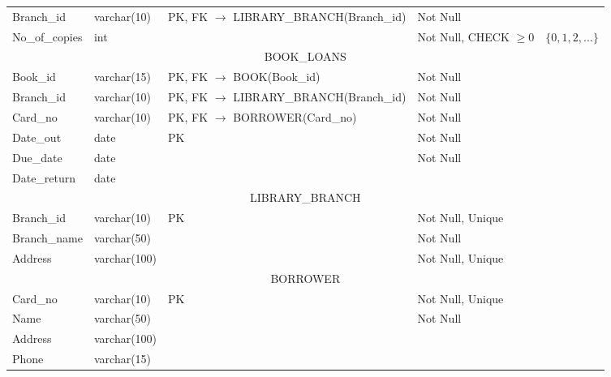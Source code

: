 \documentclass[12pt,a4paper]{article}
\begin{document}
\begin{enumerate}
\begin{enumerate}
\begin{table}[H]
{\begin{tabular}{|p{3cm}|p{2.5cm}|p{3.5cm}|p{4cm}|p{2cm}|}
        Branch\_id & varchar(10) & PK, FK $\rightarrow$ LIBRARY\_BRANCH(Branch\_id) & Not Null &  \\
        No\_of\_copies & int &  & Not Null, CHECK $\geq 0$ & $\{0,1,2,\dots\}$ \\
        \hline
        \multicolumn{5}{|c|}{BOOK\_LOANS} \\
        \hline
        Book\_id & varchar(15) & PK, FK $\rightarrow$ BOOK(Book\_id) & Not Null &  \\
        Branch\_id & varchar(10) & PK, FK $\rightarrow$ LIBRARY\_BRANCH(Branch\_id) & Not Null &  \\
        Card\_no & varchar(10) & PK, FK $\rightarrow$ BORROWER(Card\_no) & Not Null &  \\
        Date\_out & date & PK & Not Null &  \\
        Due\_date & date &  & Not Null &  \\
        Date\_return & date &  &  &  \\
        \hline
        \multicolumn{5}{|c|}{LIBRARY\_BRANCH} \\
        \hline
        Branch\_id & varchar(10) & PK & Not Null, Unique &  \\
        Branch\_name & varchar(50) &  & Not Null &  \\
        Address & varchar(100) &  & Not Null, Unique &  \\
        \hline
        \multicolumn{5}{|c|}{BORROWER} \\
        \hline
        Card\_no & varchar(10) & PK & Not Null, Unique &  \\
        Name & varchar(50) &  & Not Null &  \\
        Address & varchar(100) &  &  &  \\
        Phone & varchar(15) &  &  &  \\
        \hline
        \end{tabular}
        }
        \end{table}

    \end{enumerate}
\end{enumerate}
\end{document}
